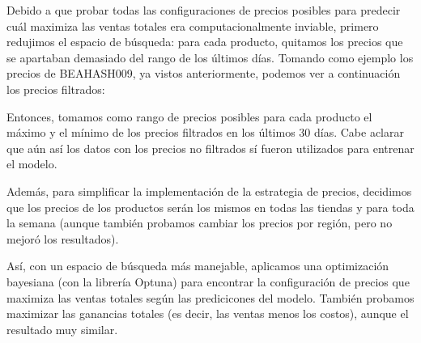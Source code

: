 \documentclass[12pt,a4paper]{article}
\begin{document}
\vspace{0.2cm}

Debido a que probar todas las configuraciones de precios posibles para predecir cuál maximiza las ventas totales era computacionalmente inviable, primero 
redujimos el espacio de búsqueda: para cada producto, quitamos los precios que se apartaban demasiado del rango de los últimos días. Tomando como ejemplo 
los precios de BEAHASH009, ya vistos anteriormente, podemos ver a continuación los precios filtrados:

\begin{center}
\end{center}

\newpage

Entonces, tomamos como rango de precios posibles para cada producto el máximo y el mínimo de los precios filtrados en los últimos 30 días. Cabe aclarar que 
aún así los datos con los precios no filtrados sí fueron utilizados para entrenar el modelo.

\vspace{0.2cm}

Además, para simplificar la implementación de la estrategia de precios, decidimos que los precios de los productos serán los mismos en todas las tiendas y 
para toda la semana (aunque también probamos cambiar los precios por región, pero no mejoró los resultados).

\vspace{0.2cm}

Así, con un espacio de búsqueda más manejable, aplicamos una optimización bayesiana (con la librería Optuna) para encontrar la configuración de precios 
que maximiza las ventas totales según las predicicones del modelo. También probamos maximizar las ganancias totales (es decir, las ventas menos los costos), aunque 
el resultado muy similar.
\end{document}
